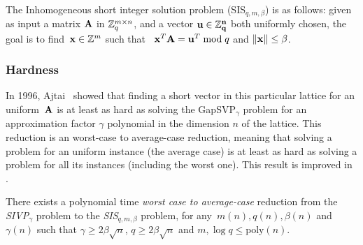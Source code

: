 \begin{definition}\label{def:ISIS}
The Inhomogeneous short integer solution problem (SIS$_{q,m,\beta}$) is as follows: given as input a matrix $\bf A$  in $\mathbb{Z}_q^{m \times n}$, and a vector $\bf{u} \in \mathbb{Z}_q^n$ both uniformly chosen, the goal is to find~${\bf x} \in \mathbb{Z}^{m}$ such that~ ${\bf x}^T {\bf A} = {\bf u}^T \bmod q$ and $\|{\bf x}\| \leq \beta $. 

\end{definition}


\subsubsection{Hardness}

In 1996, Ajtai~\cite{Ajtai96} showed that finding a short vector in this particular lattice for an uniform~$\bf A$ is at least as hard as solving the GapSVP$_{\gamma}$ problem for an approximation factor $\gamma$ polynomial in the dimension $n$ of the lattice.
This reduction is an worst-case to average-case reduction, meaning that solving a problem for an uniform instance (the average case) is at least as hard as solving a problem for all its instances (including the worst one). This result is improved in \cite{MR04,GPV08}.



\begin{theorem}
\label{th:GPV_SIS}\label{WCAV}
There exists a polynomial time \emph{worst case to average-case} reduction from the \emph{SIVP}$_{\gamma}$ problem to the \emph{SIS}$_{q,m,\beta}$ problem, for any~$m(n), q(n), \beta(n)$ and~$\gamma(n)$ such that $\gamma \geq 2 \beta \sqrt{n}$, $q \geq 2 \beta \sqrt{n}$ and $m,  \log q \leq \text{poly}(n)$.
\end{theorem}


